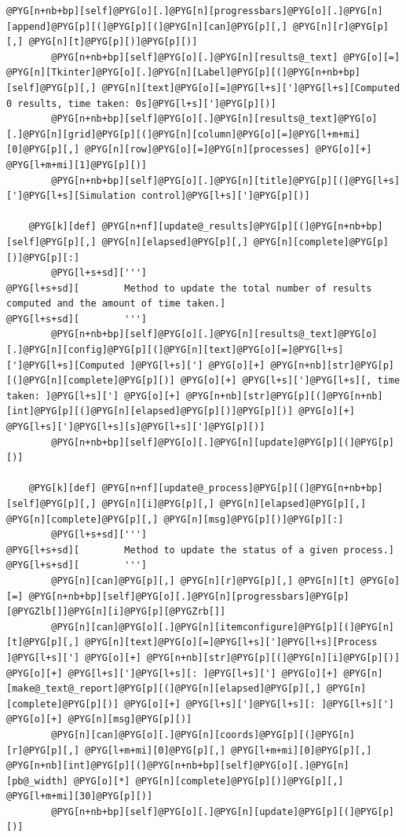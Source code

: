\documentclass[letterpaper,10pt,english]{manual}
\begin{document}
\begin{Verbatim}[commandchars=@\[\]]
            @PYG[n+nb+bp][self]@PYG[o][.]@PYG[n][progressbars]@PYG[o][.]@PYG[n][append]@PYG[p][(]@PYG[p][(]@PYG[n][can]@PYG[p][,] @PYG[n][r]@PYG[p][,] @PYG[n][t]@PYG[p][)]@PYG[p][)]
        @PYG[n+nb+bp][self]@PYG[o][.]@PYG[n][results@_text] @PYG[o][=] @PYG[n][Tkinter]@PYG[o][.]@PYG[n][Label]@PYG[p][(]@PYG[n+nb+bp][self]@PYG[p][,] @PYG[n][text]@PYG[o][=]@PYG[l+s][']@PYG[l+s][Computed 0 results, time taken: 0s]@PYG[l+s][']@PYG[p][)]
        @PYG[n+nb+bp][self]@PYG[o][.]@PYG[n][results@_text]@PYG[o][.]@PYG[n][grid]@PYG[p][(]@PYG[n][column]@PYG[o][=]@PYG[l+m+mi][0]@PYG[p][,] @PYG[n][row]@PYG[o][=]@PYG[n][processes] @PYG[o][+] @PYG[l+m+mi][1]@PYG[p][)]
        @PYG[n+nb+bp][self]@PYG[o][.]@PYG[n][title]@PYG[p][(]@PYG[l+s][']@PYG[l+s][Simulation control]@PYG[l+s][']@PYG[p][)]

    @PYG[k][def] @PYG[n+nf][update@_results]@PYG[p][(]@PYG[n+nb+bp][self]@PYG[p][,] @PYG[n][elapsed]@PYG[p][,] @PYG[n][complete]@PYG[p][)]@PYG[p][:]
        @PYG[l+s+sd][''']
@PYG[l+s+sd][        Method to update the total number of results computed and the amount of time taken.]
@PYG[l+s+sd][        ''']
        @PYG[n+nb+bp][self]@PYG[o][.]@PYG[n][results@_text]@PYG[o][.]@PYG[n][config]@PYG[p][(]@PYG[n][text]@PYG[o][=]@PYG[l+s][']@PYG[l+s][Computed ]@PYG[l+s]['] @PYG[o][+] @PYG[n+nb][str]@PYG[p][(]@PYG[n][complete]@PYG[p][)] @PYG[o][+] @PYG[l+s][']@PYG[l+s][, time taken: ]@PYG[l+s]['] @PYG[o][+] @PYG[n+nb][str]@PYG[p][(]@PYG[n+nb][int]@PYG[p][(]@PYG[n][elapsed]@PYG[p][)]@PYG[p][)] @PYG[o][+] @PYG[l+s][']@PYG[l+s][s]@PYG[l+s][']@PYG[p][)]
        @PYG[n+nb+bp][self]@PYG[o][.]@PYG[n][update]@PYG[p][(]@PYG[p][)]

    @PYG[k][def] @PYG[n+nf][update@_process]@PYG[p][(]@PYG[n+nb+bp][self]@PYG[p][,] @PYG[n][i]@PYG[p][,] @PYG[n][elapsed]@PYG[p][,] @PYG[n][complete]@PYG[p][,] @PYG[n][msg]@PYG[p][)]@PYG[p][:]
        @PYG[l+s+sd][''']
@PYG[l+s+sd][        Method to update the status of a given process.]
@PYG[l+s+sd][        ''']
        @PYG[n][can]@PYG[p][,] @PYG[n][r]@PYG[p][,] @PYG[n][t] @PYG[o][=] @PYG[n+nb+bp][self]@PYG[o][.]@PYG[n][progressbars]@PYG[p][@PYGZlb[]]@PYG[n][i]@PYG[p][@PYGZrb[]]
        @PYG[n][can]@PYG[o][.]@PYG[n][itemconfigure]@PYG[p][(]@PYG[n][t]@PYG[p][,] @PYG[n][text]@PYG[o][=]@PYG[l+s][']@PYG[l+s][Process ]@PYG[l+s]['] @PYG[o][+] @PYG[n+nb][str]@PYG[p][(]@PYG[n][i]@PYG[p][)] @PYG[o][+] @PYG[l+s][']@PYG[l+s][: ]@PYG[l+s]['] @PYG[o][+] @PYG[n][make@_text@_report]@PYG[p][(]@PYG[n][elapsed]@PYG[p][,] @PYG[n][complete]@PYG[p][)] @PYG[o][+] @PYG[l+s][']@PYG[l+s][: ]@PYG[l+s]['] @PYG[o][+] @PYG[n][msg]@PYG[p][)]
        @PYG[n][can]@PYG[o][.]@PYG[n][coords]@PYG[p][(]@PYG[n][r]@PYG[p][,] @PYG[l+m+mi][0]@PYG[p][,] @PYG[l+m+mi][0]@PYG[p][,] @PYG[n+nb][int]@PYG[p][(]@PYG[n+nb+bp][self]@PYG[o][.]@PYG[n][pb@_width] @PYG[o][*] @PYG[n][complete]@PYG[p][)]@PYG[p][,] @PYG[l+m+mi][30]@PYG[p][)]
        @PYG[n+nb+bp][self]@PYG[o][.]@PYG[n][update]@PYG[p][(]@PYG[p][)]


\end{Verbatim}
\end{document}
